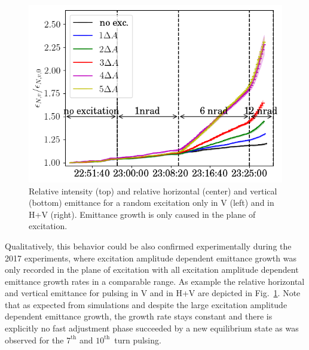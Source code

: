 \documentclass[%
 reprint,
 amsmath,amssymb,
 aps,
prstab,
]{revtex4-1}
\begin{document}
\begin{figure}[b]
\begin{minipage}[t]{0.49\linewidth}
	\end{minipage}	
	\begin{minipage}[t]{0.49\linewidth}
		\centering
		\includegraphics[width=1.0\linewidth]{2017_emitv_avg_rel_hvran_no_damper.png}
	\end{minipage}	
	\caption{\label{fig:ranexp} Relative intensity (top) and relative horizontal (center) and vertical (bottom) emittance for a random excitation only in V (left) and in H+V (right). Emittance growth is only caused in the plane of excitation.}
\end{figure}
Qualitatively, this behavior could be also confirmed experimentally during the 2017 experiments, where excitation amplitude dependent emittance growth was only recorded in the plane of excitation with all excitation amplitude dependent emittance growth rates in a comparable range. As example the relative horizontal and vertical emittance for pulsing in V and in H+V are depicted in Fig.~\ref{fig:ranexp}. Note that as expected from simulations and despite the large excitation amplitude dependent emittance growth, the growth rate stays constant and there is explicitly no fast adjustment phase succeeded by a new equilibrium state as was observed for the $7^{\mathrm{th}}$ and $10^{\mathrm{th}}$~turn pulsing.
\end{document}
